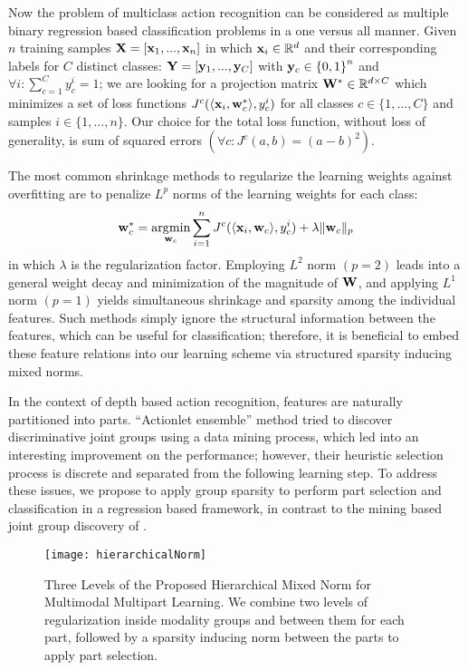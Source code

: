 \documentclass[9pt,technote,compsoc]{IEEEtran}
\begin{document}
Now the problem of multiclass action recognition can be considered as multiple binary regression based classification problems in a one versus all manner. Given $n$ training samples ${\bf X}=[{\bf x}_1,...,{\bf x}_n]$ in which ${\bf x}_i\in \mathbb{R}^{d}$ and their corresponding labels for $C$ distinct classes: ${\bf Y}=[{\bf y}_1,...,{\bf y}_C]$ with ${\bf y}_c\in{\lbrace0,1\rbrace}^n$ and $\forall i: \mathop\sum_{c=1}^{C}y_c^i=1$; we are looking for a projection matrix ${\bf W}^*\in\mathbb{R}^{d \times C}$ which minimizes a set of loss functions $J^c(\langle{\bf x}_i,{\bf w}_c^*\rangle,y_c^i)$ for all classes $c\in\lbrace1,...,C\rbrace$ and samples $i\in\lbrace1,...,n\rbrace$. Our choice for the total loss function, without loss of generality, is sum of squared errors $(\forall c: J^c(a,b) = (a-b)^2)$.

The most common shrinkage methods to regularize the learning weights against overfitting are to penalize $L^p$ norms of the learning weights for each class:
\begin{equation}
\label{eqn_regularization}{\bf w}_c^*=\mathop{\arg\!\min}_{{\bf w}_c}\sum_{i=1}^{n}J^c(\langle{\bf x}_i,{\bf w}_c\rangle,y_c^i)+\lambda \|{\bf w}_c\|_p
\end{equation}
in which $\lambda$ is the regularization factor. Employing $L^2$ norm $(p=2)$ leads into a general weight decay and minimization of the magnitude of $\bf W$, and applying $L^1$ norm $(p=1)$ yields simultaneous shrinkage and sparsity among the individual features. Such methods simply ignore the structural information between the features, which can be useful for classification; therefore, it is beneficial to embed these feature relations into our learning scheme via structured sparsity inducing mixed norms. 

In the context of depth based action recognition, features are naturally partitioned into parts. ``Actionlet ensemble'' method \cite{actionletPAMI} tried to discover discriminative joint groups using a data mining process, which led into an interesting improvement on the performance; however, their heuristic selection process is discrete and separated from the following learning step. To address these issues, we propose to apply group sparsity to perform part selection and classification in a regression based framework, in contrast to the mining based joint group discovery of \cite{actionletPAMI}.

\begin{figure}
\centering
\texttt{[image: hierarchicalNorm]}
\caption{Three Levels of the Proposed Hierarchical Mixed Norm for Multimodal Multipart Learning. We combine two levels of regularization inside modality groups and between them for each part, followed by a sparsity inducing norm between the parts to apply part selection.}
\label{fig:FrameworkHieararchical}
\end{figure}
\end{document}
